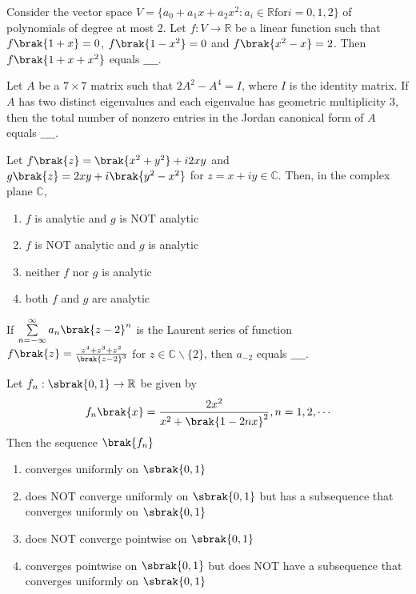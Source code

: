 \iffalse
\chapter{2017}
\author{AI24BTECH11009}
\section{ma}
\fi

\item Consider the vector space $V = \{a_0 + a_1x + a_2x^2 : a_i \in \mathbb{R} \text{for} i = 0, 1 ,2\}$ of polynomials of degree at most 2. Let $f: V \rightarrow \mathbb{R}$ be a linear function such that $f\brak{1+x} = 0$, $f\brak{1-x^2} = 0$ and $f\brak{x^2-x} = 2$. Then $f\brak{1+x+x^2}$ equals $\_\_\_\_$. \\
\item Let $A$ be a $7 \times 7$ matrix such that $2A^2 - A^4 = I$, where $I$ is the identity matrix. If $A$ has two distinct eigenvalues and each eigenvalue has geometric multiplicity 3, then the total number of nonzero entries in the Jordan canonical form of $A$ equals $\_\_\_\_$. \\
\item Let $f\brak{z} = \brak{x^2 + y^2} + i2xy$ and $g\brak{z} = 2xy + i\brak{y^2 - x^2}$ for $z = x + iy \in \mathbb{C}$. Then, in the complex plane $\mathbb{C}$,
\begin{enumerate}
    \item $f$ is analytic and $g$ is NOT analytic
    \item $f$ is NOT analytic and $g$ is analytic
    \item neither $f$ nor $g$ is analytic
    \item both $f$ and $g$ are analytic \\
\end{enumerate}
\item If $\sum\limits_{n=-\infty}^{\infty}a_n\brak{z-2}^n$ is the Laurent series of function $f\brak{z} = \frac{z^4 + z^3 + z^2}{\brak{z - 2}^3}$ for $z \in \mathbb{C}\backslash\{2\}$, then $a_{-2}$ equals $\_\_\_\_$. \\
\item Let $f_n : \sbrak{0,1}\rightarrow\mathbb{R}$ be given by 
\begin{align*}
    f_n\brak{x} = \frac{2x^2}{x^2 + \brak{1-2nx}^2}, n = 1, 2, \cdots
\end{align*}
Then the sequence $\brak{f_n}$
\begin{enumerate}
    \item converges uniformly on $\sbrak{0,1}$
    \item does NOT converge uniformly on $\sbrak{0,1}$ but has a subsequence that converges uniformly on $\sbrak{0,1}$
    \item does NOT converge pointwise on $\sbrak{0,1}$
    \item converges pointwise on $\sbrak{0,1}$ but does NOT have a subsequence that converges uniformly on $\sbrak{0,1}$ \\
\end{enumerate}
